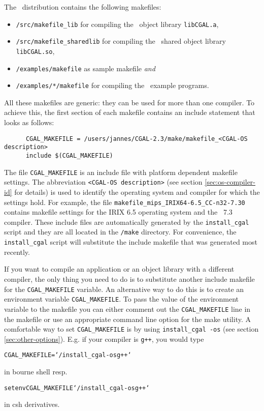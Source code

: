 The \cgal\ distribution contains the following makefiles:
\begin{itemize}
\item \texttt{\cgaldir/src/makefile\_lib} for compiling the \cgal\ 
  object library \texttt{libCGAL.a},
  
\item \texttt{\cgaldir/src/makefile\_sharedlib} for compiling the
  \cgal\ shared object library \texttt{libCGAL.so},
  
\item \texttt{\cgaldir/examples/makefile} as sample makefile
  \textit{and}
  
\item \texttt{\cgaldir/examples/*/makefile} for compiling the \cgal\ 
  example programs.
\end{itemize}

All these makefiles are generic: they can be used for more than one
compiler.  To achieve this, the first section of each makefile
contains an include statement that looks as follows:

\begin{verbatim}
      CGAL_MAKEFILE = /users/jannes/CGAL-2.3/make/makefile_<CGAL-OS description>
      include $(CGAL_MAKEFILE)
\end{verbatim}

The file \texttt{CGAL\_MAKEFILE} is an include
file with platform dependent makefile
settings. The abbreviation \texttt{<CGAL-OS description>} (see section
\ref{sec:os-compiler-id} for details) is used to identify the
operating system and compiler for which the settings hold. For
example, the file \texttt{makefile\_mips\_IRIX64-6.5\_CC-n32-7.30}
contains makefile settings for the IRIX 6.5 operating system and the
\mipsprocc\ 7.3 compiler.  These include files are automatically
generated by the \texttt{install\_cgal} script and they are all
located in the \texttt{\cgaldir/make} directory.  For convenience, the
\texttt{install\_cgal} script will substitute the include makefile
that was generated most recently.

If you want to compile an application or an object library with a
different compiler, the only thing you need to do is to substitute
another include makefile for the \texttt{CGAL\_MAKEFILE} variable. An
alternative way to do this is to create an environment variable
\texttt{CGAL\_MAKEFILE}. To pass the value of the environment variable
to the makefile you can either comment out the \texttt{CGAL\_MAKEFILE}
line in the makefile or use an appropriate command line option for the
make utility.  A comfortable way to set \texttt{CGAL\_MAKEFILE} is by
using \texttt{install\_cgal~-os} (see section
\ref{sec:other-options}).  E.g. if your compiler is \texttt{g++}, you
would type
\begin{alltt}
CGAL_MAKEFILE=`\yourcgaldir/install_cgal -os g++`
\end{alltt}
in bourne shell resp.
\begin{alltt}
setenv CGAL_MAKEFILE `\yourcgaldir/install_cgal -os g++`
\end{alltt}
in csh derivatives. 

